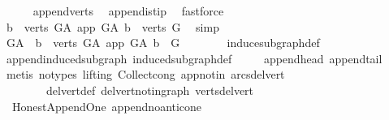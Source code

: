 \begin{isabellebody}
\ \ \ \ \isamarkupfalse%
\ append{\isacharunderscore}{\kern0pt}verts\ \isamarkupfalse%
\ append{\isacharunderscore}{\kern0pt}is{\isacharunderscore}{\kern0pt}tip\ \isamarkupfalse%
\ fastforce\isanewline
\ \ \isamarkupfalse%
\ \isamarkupfalse%
\ {\isachardoublequoteopen}{\isacharbraceleft}{\kern0pt}b\ {\isasymin}\ verts\ G{\isacharunderscore}{\kern0pt}A{\isachardot}{\kern0pt}\ app\ {\isasymrightarrow}\isactrlsup {\isacharplus}{\kern0pt}\isactrlbsub G{\isacharunderscore}{\kern0pt}A\isactrlesub \ b{\isacharbraceright}{\kern0pt}\ {\isacharequal}{\kern0pt}\ verts\ G{\isachardoublequoteclose}\ \isamarkupfalse%
\ simp\ \isanewline
\ \ \isamarkupfalse%
\ \isamarkupfalse%
\ {\isachardoublequoteopen}G{\isacharunderscore}{\kern0pt}A\ {\isasymrestriction}\ {\isacharbraceleft}{\kern0pt}b\ {\isasymin}\ verts\ G{\isacharunderscore}{\kern0pt}A{\isachardot}{\kern0pt}\ app\ {\isasymrightarrow}\isactrlsup {\isacharplus}{\kern0pt}\isactrlbsub G{\isacharunderscore}{\kern0pt}A\isactrlesub \ b{\isacharbraceright}{\kern0pt}\ {\isacharequal}{\kern0pt}\ G\ {\isachardoublequoteclose}\ \isanewline
\ \ \ \ \isamarkupfalse%
\ induce{\isacharunderscore}{\kern0pt}subgraph{\isacharunderscore}{\kern0pt}def\ \isanewline
\ \ \ \ \isamarkupfalse%
\ append{\isacharunderscore}{\kern0pt}induced{\isacharunderscore}{\kern0pt}subgraph\ induced{\isacharunderscore}{\kern0pt}subgraph{\isacharunderscore}{\kern0pt}def\ \isanewline
\ \ \ \ append{\isacharunderscore}{\kern0pt}head\ append{\isacharunderscore}{\kern0pt}tail\isanewline
\ \ \ \ \isamarkupfalse%
\ {\isacharparenleft}{\kern0pt}metis\ {\isacharparenleft}{\kern0pt}no{\isacharunderscore}{\kern0pt}types{\isacharcomma}{\kern0pt}\ lifting{\isacharparenright}{\kern0pt}\ Collect{\isacharunderscore}{\kern0pt}cong\ app{\isacharunderscore}{\kern0pt}notin\ arcs{\isacharunderscore}{\kern0pt}del{\isacharunderscore}{\kern0pt}vert\isanewline
\ \ \ \ \ \ \ \ del{\isacharunderscore}{\kern0pt}vert{\isacharunderscore}{\kern0pt}def\ del{\isacharunderscore}{\kern0pt}vert{\isacharunderscore}{\kern0pt}not{\isacharunderscore}{\kern0pt}in{\isacharunderscore}{\kern0pt}graph\ verts{\isacharunderscore}{\kern0pt}del{\isacharunderscore}{\kern0pt}vert{\isacharparenright}{\kern0pt}\ \isanewline
{}\isamarkupfalse%
%
\endisatagproof
{\isafoldproof}%
%
\isadelimproof
\isanewline
%
\endisadelimproof
\isanewline
{}\isamarkupfalse%
\ {\isacharparenleft}{\kern0pt}\ Honest{\isacharunderscore}{\kern0pt}Append{\isacharunderscore}{\kern0pt}One{\isacharparenright}{\kern0pt}\ append{\isacharunderscore}{\kern0pt}no{\isacharunderscore}{\kern0pt}anticone{\isacharcolon}{\kern0pt}\isanewline

\end{isabellebody}
